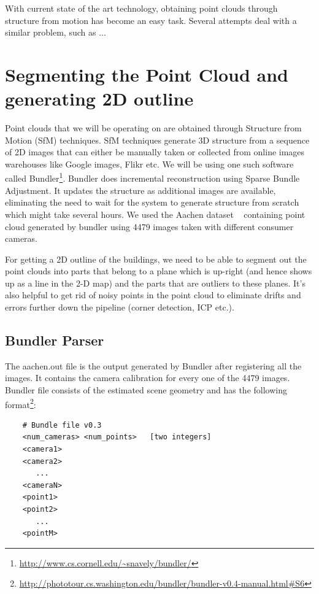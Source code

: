 \documentclass[10pt,twocolumn,letterpaper]{article}
\begin{document}
With current state of  the art technology, obtaining point clouds through structure from motion has become an easy task. 
Several attempts deal with a similar problem, such as ... 

\section{Segmenting the Point Cloud and generating 2D outline}

Point clouds that we will be operating on are obtained through Structure from Motion (SfM) techniques. SfM techniques generate 3D structure from a sequence of 2D images that can either be manually taken or collected from online images warehouses like Google images, Flikr etc. We will be using one such software called Bundler\footnote{\url{http://www.cs.cornell.edu/~snavely/bundler/}}. Bundler does incremental reconstruction using Sparse Bundle Adjustment. It updates the structure as additional images are available, eliminating the need to wait for the system to generate structure from scratch which might take several hours. We used the Aachen dataset ~\cite{sattler2012image} containing point cloud generated by bundler using 4479 images taken with different consumer cameras.

For getting a 2D outline of the buildings, we need to be able to segment out the point clouds into parts that belong to a plane which is up-right (and hence shows up as a line in the 2-D map) and the parts that are outliers to these planes. It's also helpful to get rid of noisy points in the point cloud to eliminate drifts and errors further down the pipeline (corner detection, ICP etc.). 

\subsection{Bundler Parser}
The aachen.out file is the output generated by Bundler after registering all the images. It contains the camera calibration for every one of the 4479 images. Bundler file consists of the estimated scene geometry and has the following format\footnote{\url{http://phototour.cs.washington.edu/bundler/bundler-v0.4-manual.html\#S6}}:

{\scriptsize
\begin{verbatim}
    # Bundle file v0.3
    <num_cameras> <num_points>   [two integers]
    <camera1>
    <camera2>
       ...
    <cameraN>
    <point1>
    <point2>
       ...
    <pointM>
\end{verbatim}
}
\end{document}
